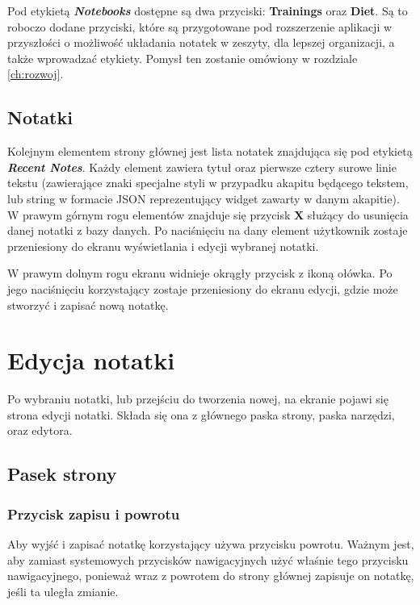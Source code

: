 Pod etykietą \textbf{\textit{Notebooks}} dostępne są dwa przyciski: \textbf{Trainings} oraz \textbf{Diet}. Są to roboczo dodane przyciski, które są przygotowane pod rozszerzenie aplikacji w przyszłości o możliwość układania notatek w zeszyty, dla lepszej organizacji, a także wprowadzać etykiety.
Pomysł ten zostanie omówiony w rozdziale \ref{ch:rozwoj}.

\subsection{Notatki}

Kolejnym elementem strony głównej jest lista notatek znajdująca się pod etykietą \textbf{\textit{Recent Notes}}. Każdy element zawiera tytuł oraz pierwsze cztery surowe linie tekstu (zawierające znaki specjalne styli w przypadku akapitu będącego tekstem, lub string w formacie JSON reprezentujący widget zawarty w danym akapitie).
W prawym górnym rogu elementów znajduje się przycisk \textbf{X} służący do usunięcia danej notatki z bazy danych.
Po naciśnięciu na dany element użytkownik zostaje przeniesiony do ekranu wyświetlania i edycji wybranej notatki.

W prawym dolnym rogu ekranu widnieje okrągły przycisk z ikoną ołówka.
Po jego naciśnięciu korzystający zostaje przeniesiony do ekranu edycji, gdzie może stworzyć i zapisać nową notatkę.

\section{Edycja notatki}

Po wybraniu notatki, lub przejściu do tworzenia nowej, na ekranie pojawi się strona edycji notatki. Składa się ona z głównego paska strony, paska narzędzi, oraz edytora.

\subsection{Pasek strony}

\subsubsection{Przycisk zapisu i powrotu}

Aby wyjść i zapisać notatkę korzystający używa przycisku powrotu.
Ważnym jest, aby zamiast systemowych przycisków nawigacyjnych użyć właśnie tego przycisku nawigacyjnego, ponieważ wraz z powrotem do strony głównej zapisuje on notatkę, jeśli ta uległa zmianie.

